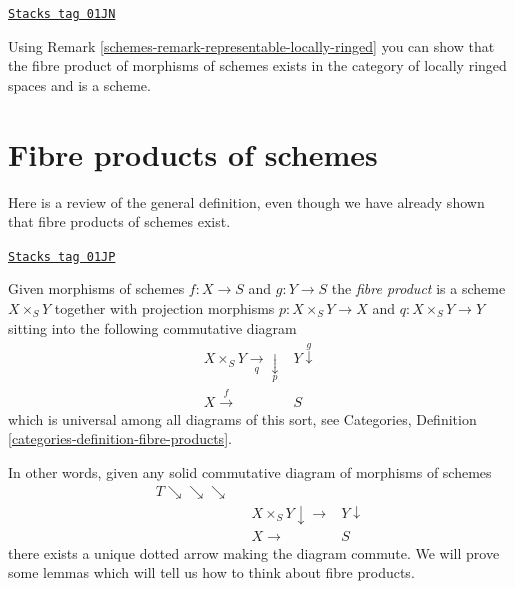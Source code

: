 \begin{remark}
\label{schemes-remark-fibre-product-schemes-locally-ringed}
\href{https://stacks.math.columbia.edu/tag/01JN}{\texttt{Stacks tag 01JN}}

Using Remark \ref{schemes-remark-representable-locally-ringed}
you can show that the fibre product of morphisms of schemes
exists in the category of locally ringed spaces and is a
scheme.
\end{remark}

\section{Fibre products of schemes}
\label{schemes-section-fibre-products}
Here is a review of the general definition, even though
we have already shown that fibre products of schemes exist.

\begin{definition}
\label{schemes-definition-fibre-product}
\href{https://stacks.math.columbia.edu/tag/01JP}{\texttt{Stacks tag 01JP}}

Given morphisms of schemes $f : X \to S$ and $g : Y \to S$
the {\it fibre product} is a scheme $X \times_S Y$ together
with projection morphisms $p : X \times_S Y \to X$
and $q : X \times_S Y \to Y$ sitting into the following
commutative diagram
$$
\begin{array}{cc}X \times_S Y \underset{q}{\longrightarrow}\underset{p}{\downarrow} & Y \overset{g}{\downarrow} \\ X \overset{f}{\longrightarrow} & S\end{array}
$$
which is universal among all diagrams of this sort,
see Categories, Definition \ref{categories-definition-fibre-products}.
\end{definition}

In other words, given any solid commutative diagram of
morphisms of schemes
$$
\begin{array}{cccc}T \searrow\searrow\searrow &  &  &  \\  &  & X \times_S Y \downarrow\longrightarrow & Y \downarrow \\  &  & X \longrightarrow & S\end{array}
$$
there exists a unique dotted arrow making the diagram commute.
We will prove some lemmas which will tell us how to think about
fibre products.

